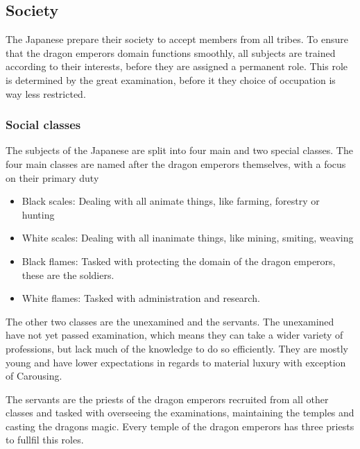 \subsection{Society}\label{ch:Tribes:Japanese:Society}

The \gls{Japanese} prepare their society to accept members from all tribes.
To ensure that the dragon emperors domain functions smoothly,
all subjects are trained according to their interests,
before they are assigned a permanent role.
This role is determined by the great examination,
before it they choice of occupation is way less restricted.

\subsubsection{Social classes}\label{ch:Tribes:Japanese:Society:Classes}

The subjects of the \gls{Japanese} are split into four main and two special classes.
The four main classes are named after the dragon emperors themselves,
with a focus on their primary duty

\begin{itemize}
	\item Black scales:
		Dealing with all animate things, like farming, forestry or hunting
	\item White scales:
		Dealing with all inanimate things, like mining, smiting, weaving
	\item Black flames:
		Tasked with protecting the domain of the dragon emperors,
		these are the soldiers.
	\item White flames:
		Tasked with administration and research.
\end{itemize}

The other two classes are the unexamined and the servants.
The unexamined have not yet passed examination,
which means they can take a wider variety of professions,
but lack much of the knowledge to do so efficiently.
They are mostly young and have lower expectations in regards
to material luxury with exception of \gls{Carousing}.

The servants are the priests of the dragon emperors
recruited from all other classes and tasked with overseeing the examinations,
maintaining the temples and casting the dragons magic.
Every temple of the dragon emperors has three priests to fullfil this roles.

